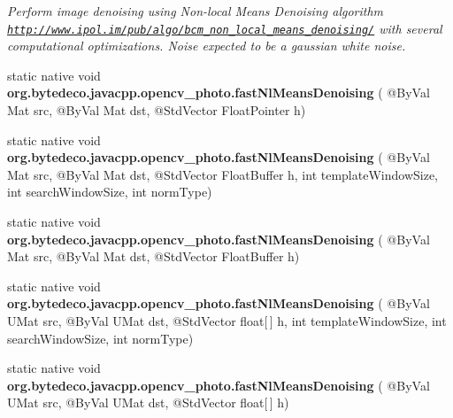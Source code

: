 \begin{DoxyCompactItemize}
\begin{DoxyCompactList}\small\item\em Perform image denoising using Non-\/local Means Denoising algorithm \href{http://www.ipol.im/pub/algo/bcm_non_local_means_denoising/}{\tt http\+://www.\+ipol.\+im/pub/algo/bcm\+\_\+non\+\_\+local\+\_\+means\+\_\+denoising/} with several computational optimizations. Noise expected to be a gaussian white noise. \end{DoxyCompactList}\item 
\mbox{\label{group__photo__denoise_gafa60a47b4232381a657ffee00ba0212e}} 
static native void {\bfseries org.\+bytedeco.\+javacpp.\+opencv\+\_\+photo.\+fast\+Nl\+Means\+Denoising} ( @By\+Val Mat src, @By\+Val Mat dst, @Std\+Vector Float\+Pointer h)
\item 
\mbox{\label{group__photo__denoise_ga4dc2d44da7dca56745637bcc867bab0d}} 
static native void {\bfseries org.\+bytedeco.\+javacpp.\+opencv\+\_\+photo.\+fast\+Nl\+Means\+Denoising} ( @By\+Val Mat src, @By\+Val Mat dst, @Std\+Vector Float\+Buffer h, int template\+Window\+Size, int search\+Window\+Size, int norm\+Type)
\item 
\mbox{\label{group__photo__denoise_gadee5a64f3b9ec97fb8eee220c10a679c}} 
static native void {\bfseries org.\+bytedeco.\+javacpp.\+opencv\+\_\+photo.\+fast\+Nl\+Means\+Denoising} ( @By\+Val Mat src, @By\+Val Mat dst, @Std\+Vector Float\+Buffer h)
\item 
\mbox{\label{group__photo__denoise_ga30441c6a6c3d44c53b5d6c17e5bc5fe0}} 
static native void {\bfseries org.\+bytedeco.\+javacpp.\+opencv\+\_\+photo.\+fast\+Nl\+Means\+Denoising} ( @By\+Val U\+Mat src, @By\+Val U\+Mat dst, @Std\+Vector float\mbox{[}$\,$\mbox{]} h, int template\+Window\+Size, int search\+Window\+Size, int norm\+Type)
\item 
\mbox{\label{group__photo__denoise_gae59c81fd9701ab3bd7dab271c19060e2}} 
static native void {\bfseries org.\+bytedeco.\+javacpp.\+opencv\+\_\+photo.\+fast\+Nl\+Means\+Denoising} ( @By\+Val U\+Mat src, @By\+Val U\+Mat dst, @Std\+Vector float\mbox{[}$\,$\mbox{]} h)
\item 
\mbox{\label{group__photo__denoise_ga09fcf713ad5a1638f88449e8b267fc08}} 

\end{DoxyCompactItemize}
